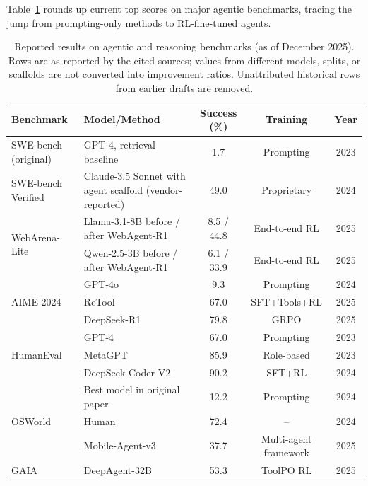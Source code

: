 \documentclass[12pt,a4paper]{report}
\theoremstyle{definition}
\begin{document}
Table~\ref{tab:sota_benchmarks} rounds up current top scores on major agentic benchmarks, tracing the jump from prompting-only methods to RL-fine-tuned agents.

\begin{table}[h]
\centering
\caption{Reported results on agentic and reasoning benchmarks (as of December 2025). Rows are as reported by the cited sources; values from different models, splits, or scaffolds are not converted into improvement ratios. Unattributed historical rows from earlier drafts are removed.}
\label{tab:sota_benchmarks}
\small
\begin{tabular}{@{}llccc@{}}
\toprule
\textbf{Benchmark} & \textbf{Model/Method} & \textbf{Success (\%)} & \textbf{Training} & \textbf{Year} \\
\midrule
SWE-bench (original) & GPT-4, retrieval baseline~\cite{jimenez2024swebench} & 1.7 & Prompting & 2023 \\
SWE-bench Verified & Claude-3.5 Sonnet with agent scaffold (vendor-reported) & 49.0 & Proprietary & 2024 \\
\midrule
\multirow{2}{*}{WebArena-Lite} & Llama-3.1-8B before / after WebAgent-R1 & 8.5 / 44.8 & End-to-end RL & 2025 \\
 & Qwen-2.5-3B before / after WebAgent-R1 & 6.1 / 33.9 & End-to-end RL & 2025 \\
\midrule
\multirow{3}{*}{AIME 2024} & GPT-4o~\cite{deepseek2025r1} & 9.3 & Prompting & 2024 \\
 & ReTool~\cite{feng2025retool} & 67.0 & SFT+Tools+RL & 2025 \\
 & DeepSeek-R1~\cite{deepseek2025r1} & 79.8 & GRPO & 2025 \\
\midrule
\multirow{3}{*}{HumanEval} & GPT-4 & 67.0 & Prompting & 2023 \\
 & MetaGPT~\cite{hong2023metagpt} & 85.9 & Role-based & 2023 \\
 & DeepSeek-Coder-V2 & 90.2 & SFT+RL & 2024 \\
\midrule
\multirow{3}{*}{OSWorld} & Best model in original paper~\cite{xie2024osworld} & 12.2 & Prompting & 2024 \\
 & Human~\cite{xie2024osworld} & 72.4 & -- & 2024 \\
 & Mobile-Agent-v3 & 37.7 & Multi-agent framework & 2025 \\
\midrule
GAIA & DeepAgent-32B~\cite{li2025deepagent} & 53.3 & ToolPO RL & 2025 \\
\bottomrule
\end{tabular}


\end{table}
\end{document}
